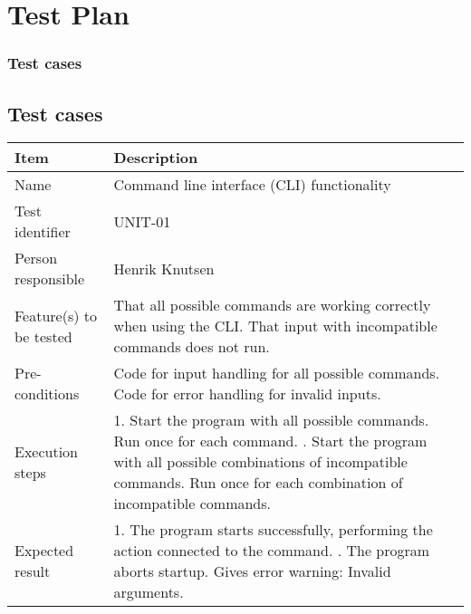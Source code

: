 
%

\chapter{Test Plan}

\minitoc

	\subsection*{Test cases}
	\section{Test cases}
		\vspace{8 mm}		

		\begin{center}
			\begin{tabular}{ |  p{3.5cm} | p{10cm} | }
				\hline
				Item & Description \\ [5pt] \hline \hline
				Name & Command line interface (CLI) functionality \\  [5pt] \hline
				Test identifier & UNIT-01 \\  [5pt] \hline
				Person responsible & Henrik Knutsen \\  [5pt] \hline
				Feature(s) to be tested & That all possible commands are working correctly when using the CLI. That input with incompatible commands does not run. \\  [5pt] \hline
				Pre-conditions & Code for input handling for all possible commands. Code for error handling for invalid inputs. \\  [5pt] \hline
				Execution steps & 1. Start the program with all possible commands. Run once for each command. \newline 2. Start the program with all possible combinations of incompatible commands. Run once for each combination of incompatible commands. \\  [5pt] \hline
				Expected result & 1. The program starts successfully, performing the action connected to the command. \newline 2. The program aborts startup. Gives error warning: Invalid arguments. \\  [5pt] \hline
			\end{tabular}
		\end{center}

